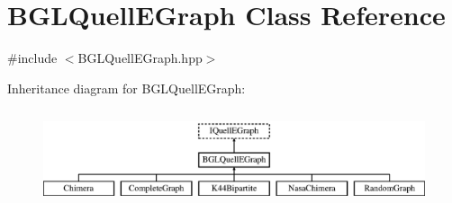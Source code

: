 \hypertarget{a00026}{}\section{B\+G\+L\+Quell\+E\+Graph Class Reference}
\label{a00026}


{\ttfamily \#include $<$B\+G\+L\+Quell\+E\+Graph.\+hpp$>$}

Inheritance diagram for B\+G\+L\+Quell\+E\+Graph\+:\begin{figure}[H]
\begin{center}
\leavevmode
\includegraphics[height=2.871795cm]{a00026}
\end{center}
\end{figure}
